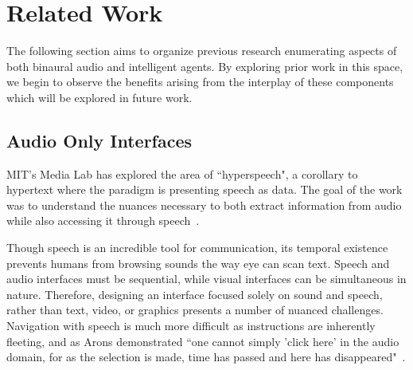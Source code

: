 \newpage                                                \chapter{Related Work}

The following section aims to organize previous research enumerating aspects
of both binaural audio and intelligent agents. By exploring prior work in this
space, we begin to observe the benefits arising from the interplay of these
components which will be explored in future work.



\section{                  Audio Only Interfaces                             }

MIT's Media Lab has explored the area of ``hyperspeech", a corollary to
hypertext where the paradigm is presenting speech as data.  The goal of the
work was to understand the nuances necessary to both extract information from
audio while also accessing it through speech~\cite{arons1991hyperspeech}.

Though speech is an incredible tool for communication, its temporal existence
prevents humans from browsing sounds the way eye can scan text.  Speech and
audio interfaces must be sequential, while visual interfaces can be
simultaneous in nature.  Therefore, designing an interface focused solely on
sound and speech, rather than text, video, or graphics presents a number of
nuanced challenges.  Navigation with speech is much more difficult as
instructions are inherently fleeting, and as Arons demonstrated ``one cannot simply
'click here' in the audio domain, for as the selection is made, time has passed
and here has  disappeared"~\cite{arons1991hyperspeech}.

